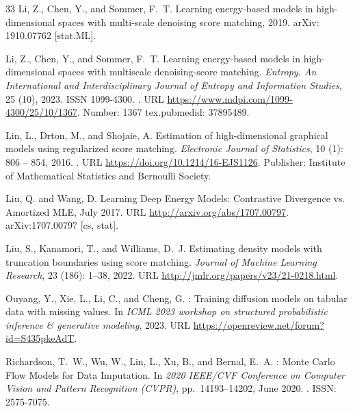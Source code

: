 \documentclass{article} %
\begin{document}
\begin{thebibliography}{33}
Li, Z., Chen, Y., and Sommer, F.~T.
\newblock Learning energy-based models in high-dimensional spaces with multi-scale denoising score matching, 2019{}.
\newblock arXiv: 1910.07762 [stat.ML].

Li, Z., Chen, Y., and Sommer, F.~T.
\newblock Learning energy-based models in high-dimensional spaces with multiscale denoising-score matching.
\newblock \emph{Entropy. An International and Interdisciplinary Journal of Entropy and Information Studies}, 25 (10), 2023.
\newblock ISSN 1099-4300.
\newblock {}.
\newblock URL \url{https://www.mdpi.com/1099-4300/25/10/1367}.
\newblock Number: 1367 tex.pubmedid: 37895489.

Lin, L., Drton, M., and Shojaie, A.
\newblock Estimation of high-dimensional graphical models using regularized score matching.
\newblock \emph{Electronic Journal of Statistics}, 10 (1): 806 -- 854, 2016.
\newblock {}.
\newblock URL \url{https://doi.org/10.1214/16-EJS1126}.
\newblock Publisher: Institute of Mathematical Statistics and Bernoulli Society.

Liu, Q. and Wang, D.
\newblock Learning {Deep} {Energy} {Models}: {Contrastive} {Divergence} vs. {Amortized} {MLE}, July 2017.
\newblock URL \url{http://arxiv.org/abs/1707.00797}.
\newblock arXiv:1707.00797 [cs, stat].

Liu, S., Kanamori, T., and Williams, D.~J.
\newblock Estimating density models with truncation boundaries using score matching.
\newblock \emph{Journal of Machine Learning Research}, 23 (186): 1--38, 2022.
\newblock URL \url{http://jmlr.org/papers/v23/21-0218.html}.

Ouyang, Y., Xie, L., Li, C., and Cheng, G.
: {Training} diffusion models on tabular data with missing values.
\newblock In \emph{{ICML} 2023 workshop on structured probabilistic inference \& generative modeling}, 2023.
\newblock URL \url{https://openreview.net/forum?id=S435pkeAdT}.

Richardson, T.~W., Wu, W., Lin, L., Xu, B., and Bernal, E.~A.
: {Monte} {Carlo} {Flow} {Models} for {Data} {Imputation}.
\newblock In \emph{2020 {IEEE}/{CVF} {Conference} on {Computer} {Vision} and {Pattern} {Recognition} ({CVPR})}, pp.\  14193--14202, June 2020.
\newblock {}.
\newblock ISSN: 2575-7075.


\end{thebibliography}
\end{document}
